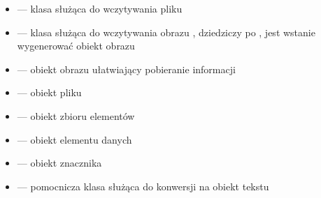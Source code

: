 \gdcmclassExplanations

\begin{itemize}
    \item {} --- klasa służąca do wczytywania pliku \DICOM
    \item {} --- klasa służąca do wczytywania obrazu \DICOM, dziedziczy po , jest wstanie wygenerować obiekt obrazu
    \item {} --- obiekt obrazu ułatwiający pobieranie informacji
    \item {} --- obiekt pliku \DICOM
    \item {} --- obiekt zbioru elementów
    \item {} --- obiekt elementu danych
    \item {} --- obiekt znacznika
    \item {} --- pomocnicza klasa służąca do konwersji na obiekt tekstu
\end{itemize}